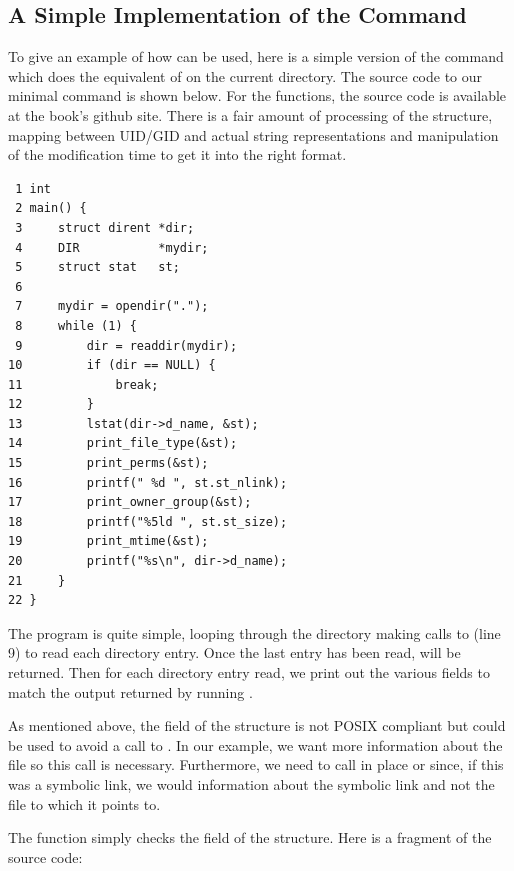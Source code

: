 
\subsection{A Simple Implementation of the  Command}\label{ls-command}

To give an example of how  can be used, here is a simple version of the  command which does the equivalent of  on the current directory. The source code to our minimal  command is shown below. For the  functions, the source code is available at the book's github site. There is a fair amount of processing of the  structure, mapping between UID/GID and actual string representations and manipulation of the modification time to get it into the right format. 

\begin{lstlisting}
 1 int
 2 main() {
 3     struct dirent *dir;
 4     DIR           *mydir;
 5     struct stat   st;
 6  
 7     mydir = opendir(".");
 8     while (1) {
 9         dir = readdir(mydir);
10         if (dir == NULL) {
11             break;
12         }
13         lstat(dir->d_name, &st);
14         print_file_type(&st);
15         print_perms(&st);
16         printf(" %d ", st.st_nlink);
17         print_owner_group(&st);
18         printf("%5ld ", st.st_size);
19         print_mtime(&st);
20         printf("%s\n", dir->d_name);
21     }
22 }
\end{lstlisting}

\noindent
The program is quite simple, looping through the directory making calls to  (line 9) to read each directory entry. Once the last entry has been read,  will be returned. Then for each directory entry read, we print out the various fields to match the output returned by running .

As mentioned above, the  field of the  structure is not POSIX compliant but could be used to avoid a call to . In our example, we want more information about the file so this call is necessary. Furthermore, we need to call  in place or  since, if this was a symbolic link, we would information about the symbolic link and not the file to which it points to.

The  function simply checks the  field of the  structure. Here is a fragment of the source code:

